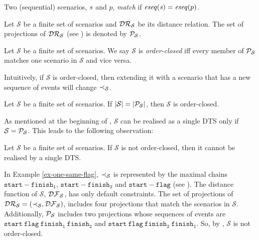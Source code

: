 \begin{definition}
\label{def-match}
Two (sequential) scenarios, $\mathit{s}$ and $p$, \emph{match} if
$\mathit{eseq}(\mathit{s})=\mathit{eseq}(p)$.
\end{definition}
\begin{definition}
\label{def-DR-Proj}
Let $\mathcal{S}$ be a finite set of scenarios and $\mathcal{DR}_{\mathcal{S}}$ be
its distance relation. The set of projections of $\mathcal{DR}_{\mathcal{S}}$
(see )
is
denoted by $\mathcal{P}_{\mathcal{S}}$.
\end{definition}
\begin{definition}
\label{def-order-closed}
Let $\mathcal{S}$ be a finite set of scenarios.
We say $\mathcal{S}$ is \emph{order-closed} iff
every member of $\mathcal{P}_{\mathcal{S}}$  matches one scenario in
$\mathcal{S}$ and vice versa.
\end{definition}
\noindent
Intuitively, if $\mathcal{S}$ is order-closed, then extending it with
a scenario that has a new sequence of events will change
$\prec_{\mathcal{S}}$.
\begin{obs}
\label{obs-order-closed-1}
Let $\mathcal{S}$ be a finite set of scenarios.
If $|\mathcal{S}|=|\mathcal{P}_{\mathcal{S}}|$, then
$\mathcal{S}$ is order-closed.
\end{obs}
\noindent
As mentioned at the beginning of , $\mathcal{S}$ can
be realised as a single DTS only if
$\mathcal{S}=\mathcal{P}_{\mathcal{S}}$. This leads to the following observation:
\begin{obs}
\label{obs-order-proj-2}
Let $\mathcal{S}$ be a finite set of scenarios.
If $\mathcal{S}$
is not order-closed, then it cannot be realised by a single DTS.
\end{obs}
\noindent
In Example \ref{ex-one-same-flag}, $\prec_{\mathcal{S}}$
is represented by the maximal chains $\mathtt{start}-\mathtt{finish_1}$,
$\mathtt{start}-\mathtt{finish_2}$ and
$\mathtt{start}-\mathtt{flag}$ (see ).
The distance function of $\mathcal{S}$, $\mathcal{DF}_{\mathcal{S}}$, has only
default constraints.
The set of projections of
$\mathcal{DR}_{\mathcal{S}}=(\prec_{\mathcal{S}},\mathcal{DF}_{\mathcal{S}})$, includes
four projections that match the
scenarios in $\mathcal{S}$.
Additionally, $\mathcal{P}_{\mathcal{S}}$ includes two
projections whose sequences of events are
$\mathtt{start}~ \mathtt{flag}~ \mathtt{finish_1}~ \mathtt{finish_2}$
and
$\mathtt{start}~ \mathtt{flag}~ \mathtt{finish_2}~ \mathtt{finish_1}$.
So, by ,
$\mathcal{S}$ is not order-closed.

